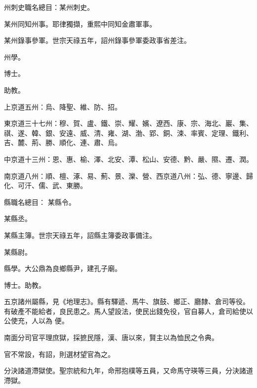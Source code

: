 \begin{pinyinscope}
 州刺史職名總目：某州刺史。



 某州同知州事。耶律獨擷，重熙中同知金肅軍事。



 某州錄事參軍。世宗天祿五年，詔州錄事參軍委政事省差注。



 州學。



 博士。



 助教。



 上京道五州：烏、降聖、維、防、招。



 東京道三十七州：穆、賀、盧、鐵、崇、耀、嬪、遼西、康、宗、海北、巖、集、祺、遂、韓、銀、安遠、威、清、雍、湖、渤、郢、銅、涑、率賓、定理、鐵利、吉、麓、荊、勝、順化、連、肅、烏。



 中京道十三州：恩、惠、榆、澤、北安、潭、松山、安德、黔、嚴、隰、遷、潤。



 南京道八州：順、檀、涿、易、薊、景、灤、營、西京道八州：弘、德、寧邊、歸化、可汗、儒、武、東勝。



 縣職名總目：
 某縣令。



 某縣丞。



 某縣主簿。世宗天祿五年，詔縣主簿委政事備注。



 某縣尉。



 縣學。大公鼎為良鄉縣尹，建孔子廟。



 博士。助教。



 五京諸州屬縣，見《地理志》。縣有驛遞、馬牛、旗鼓、鄉正、廳隸、倉司等役。有破產不能給者，良民患之。馬人望設法，使民出錢免役，官自募人，倉司給使以公使充，人以為
 便。



 南面分司官平理庶獄，採摭民隱，漢、唐以來，賢主以為恤民之令典。



 官不常設，有詔，則選材望官為之。



 分決諸道滯獄使。聖宗統和九年，命邢抱樸等五員，又命馬守瑛等三員，分決諸道滯獄。




\end{pinyinscope}
